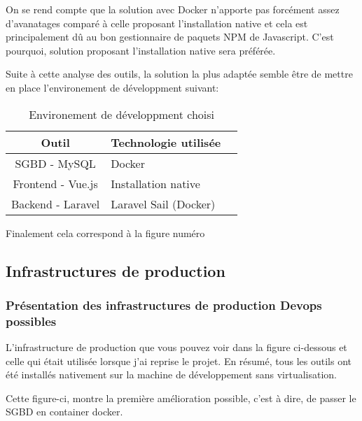 \documentclass[
    iai, %
    il, %
]{heig-tb}
\begin{document}
On se rend compte que la solution avec Docker n'apporte pas forcément assez d'avanatages comparé à celle proposant l'installation native et cela est principalement dû au bon gestionnaire de paquets NPM de Javascript. C'est pourquoi, solution proposant l'installation native sera préférée.

Suite à cette analyse des outils, la solution la plus adaptée semble être de mettre en place l'environement de développment suivant:

\begin{table}[h]
    \begin{center}
        \caption{Environement de développment choisi \label{env_dev}}
        \begin{tabular}{c|l|r}
            Outil             & Technologie utilisée  \\ \hline
            SGBD - MySQL      & Docker                \\
            Frontend - Vue.js & Installation native   \\
            Backend - Laravel & Laravel Sail (Docker) \\
        \end{tabular}
    \end{center}
\end{table}


Finalement cela correspond à la figure numéro %

\clearpage
\subsection{Infrastructures de production}

\subsubsection{Présentation des infrastructures de production Devops possibles}
L'infrastructure de production que vous pouvez voir dans la figure ci-dessous et celle qui était utilisée lorsque j'ai reprise le projet.
En résumé, tous les outils ont été installés nativement sur la machine de développement sans virtualisation.

Cette figure-ci, montre la première amélioration possible, c'est à dire, de passer le SGBD en container docker.
\end{document}
